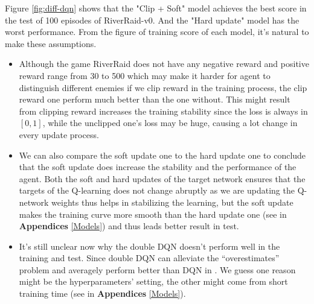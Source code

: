 \documentclass[12pt]{article}
\begin{document}
Figure \ref{fig:diff-dqn} shows that the "Clip + Soft" model achieves the best score in the test of 100 episodes of RiverRaid-v0. And the "Hard update" model has the worst performance. From the figure of training score of each model, it's natural to make these assumptions.

\begin{itemize}
    \item Although the game RiverRaid does not have any negative reward and positive reward range from 30 to 500 which may make it harder for agent to distinguish different enemies if we clip reward in the training process, the clip reward one perform much better than the one without. This might result from clipping reward increases the training stability since the loss is always in $ [0,1] $, while the unclipped one’s loss may be huge, causing a lot change in every update process.
    \item We can also compare the soft update one to the hard update one to conclude that the soft update does increase the stability and the performance of the agent. Both the soft and hard updates of the target network ensures that the targets of the Q-learning does not change abruptly as we are updating the Q-network weights thus helps in stabilizing the learning,  but the soft update makes the training curve more smooth than the hard update one (see in \textbf{Appendices} \ref{Models}) and thus leads better result in test.

    \item It’s still unclear now why the double DQN doesn't perform well in the training and test. Since double DQN can alleviate the “overestimates” problem and averagely perform better than DQN in \cite{hasselt2015deep}. We guess one reason might be the hyperparameters’ setting, the other might come from short training time (see in \textbf{Appendices} \ref{Models}).
\end{itemize}
\end{document}
